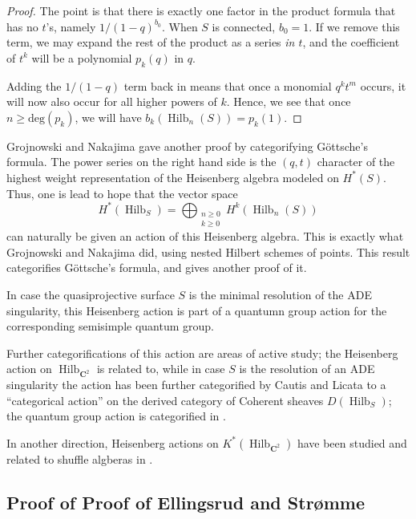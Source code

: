 \documentclass{amsart}[12pt]
\theoremstyle{definition}
\newcommand{\C}{\mathbf{C}}
\DeclareMathOperator{\Hilb}{Hilb}
\newcommand{\HG}{\Hilb}
\begin{document}
\begin{proof}
The point is that there is exactly one factor in the product formula that has no $t$'s, namely $1/(1-q)^{b_0}$.  When $S$ is connected, $b_0=1$.  If we remove this term, we may expand the rest of the product as a series \emph{in $t$}, and the coefficient of $t^k$ will be a polynomial $p_k(q)$ in $q$.  

Adding the $1/(1-q)$ term back in means that once a monomial $q^kt^m$ occurs, it will now also occur for all higher powers of $k$.  Hence, we see that once $n\geq\text{deg}(p_k)$, we will have $b_k(\Hilb_n(S))=p_k(1)$.
\end{proof}

Grojnowski and Nakajima \cite{grojnowski, nakajimaheisenberg} gave another proof by categorifying G\"ottsche's formula.  The power series on the right hand side is the $(q,t)$ character of the highest weight representation of the Heisenberg algebra modeled on $H^*(S)$.  Thus, one is lead to hope that the vector space 
$$H^*(\HG_S)=\bigoplus_{\substack{n\geq 0 \\ k\geq 0}} H^k(\Hilb_n(S))$$
can naturally be given an action of this Heisenberg algebra.  This is exactly what Grojnowski and Nakajima did, using nested Hilbert schemes of points.  This result categorifies G\"ottsche's formula, and gives another proof of it.

In case the quasiprojective surface $S$ is the minimal resolution of the ADE singularity, this Heisenberg action is part of a quantumn group action for the corresponding semisimple quantum group.

Further categorifications of this action are areas of active study; the Heisenberg action on $\HG_{\C^2}$ is related to, while in case $S$ is the resolution of an ADE singularity the action has been further categorified by Cautis and Licata \cite{CL} to a ``categorical action'' on the derived category of Coherent sheaves $D(\Hilb_S)$; the quantum group action is categorified in \cite{CL2}.

In another direction, Heisenberg actions on $K^*(\HG_{\C^2})$ have been studied and related to shuffle algberas in \cite{FT, SV}.




\subsection{Proof of \texorpdfstring{Proof of Ellingsrud and Str\o mme}{Proof of Ellingsrud and Stromme}}
\end{document}
